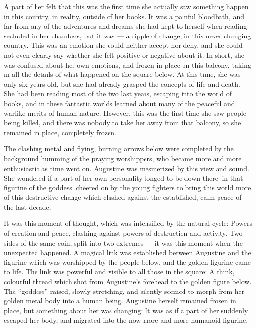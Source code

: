 A part of her felt that this was the first time she actually saw something happen in this country, in reality, outside of her books. It was a painful bloodbath, and far from any of the adventures and dreams she had kept to herself when reading secluded in her chambers, but it was --- a ripple of change, in this never changing country. This was an emotion she could neither accept nor deny, and she could not even clearly say whether she felt positive or negative about it. In short, she was confused about her own emotions, and frozen in place on this balcony, taking in all the details of what happened on the square below. At this time, she was only six years old, but she had already grasped the concepts of life and death. She had been reading most of the two last years, escaping into the world of books, and in these fantastic worlds learned about many of the peaceful and warlike merits of human nature. However, this was the first time she saw people being killed, and there was nobody to take her away from that balcony, so she remained in place, completely frozen.

The clashing metal and flying, burning arrows below were completed by the background humming of the praying worshippers, who became more and more enthusiastic as time went on. Augustine was mesmerized by this view and sound. She wondered if a part of her own personality longed to be down there, in that figurine of the goddess, cheered on by the young fighters to bring this world more of this destructive change which clashed against the established, calm peace of the last decade.

It was this moment of thought, which was intensified by the natural cycle: Powers of creation and peace, clashing against powers of destruction and activity. Two sides of the same coin, split into two extremes --- it was this moment when the unexpected happened. A magical link was established between Augustine and the figurine which was worshipped by the people below, and the golden figurine came to life. The link was powerful and visible to all those in the square: A think, colourful thread which shot from Augustine's forehead to the golden figure below. The \enquote{goddess} raised, slowly stretching, and silently seemed to morph from her golden metal body into a human being. Augustine herself remained frozen in place, but something about her was changing: It was as if a part of her suddenly escaped her body, and migrated into the now more and more humanoid figurine.


